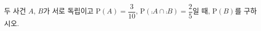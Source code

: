 두 사건 $A$, $B$가 서로 독립이고 $\mathrm{P}(A)=\dfrac{3}{10}$, $\mathrm{P}(\comp{A}\cap\comp{B})=\dfrac{2}{5}$일 때, $\mathrm{P}(B)$를 구하시오.
